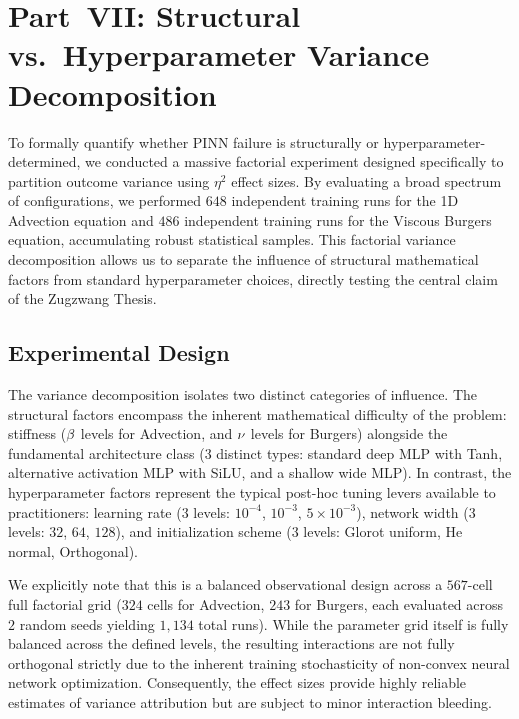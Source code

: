 \section{Part~VII: Structural vs.\ Hyperparameter Variance Decomposition}\label{sec:part7}

To formally quantify whether PINN failure is structurally or hyperparameter-determined, we conducted a massive factorial experiment designed specifically to partition outcome variance using $\eta^2$ effect sizes. By evaluating a broad spectrum of configurations, we performed $648$ independent training runs for the 1D Advection equation and $486$ independent training runs for the Viscous Burgers equation, accumulating robust statistical samples. This factorial variance decomposition allows us to separate the influence of structural mathematical factors from standard hyperparameter choices, directly testing the central claim of the Zugzwang Thesis.

\subsection{Experimental Design}\label{sec:exp27}

The variance decomposition isolates two distinct categories of influence. The structural factors encompass the inherent mathematical difficulty of the problem: stiffness ($\beta$ levels for Advection, and $\nu$ levels for Burgers) alongside the fundamental architecture class ($3$ distinct types: standard deep MLP with Tanh, alternative activation MLP with SiLU, and a shallow wide MLP). In contrast, the hyperparameter factors represent the typical post-hoc tuning levers available to practitioners: learning rate ($3$ levels: $10^{-4}$, $10^{-3}$, $5\times10^{-3}$), network width ($3$ levels: $32$, $64$, $128$), and initialization scheme ($3$ levels: Glorot uniform, He normal, Orthogonal).

We explicitly note that this is a balanced observational design across a $567$-cell full factorial grid ($324$ cells for Advection, $243$ for Burgers, each evaluated across $2$ random seeds yielding $1{,}134$ total runs). While the parameter grid itself is fully balanced across the defined levels, the resulting interactions are not fully orthogonal strictly due to the inherent training stochasticity of non-convex neural network optimization. Consequently, the effect sizes provide highly reliable estimates of variance attribution but are subject to minor interaction bleeding.


